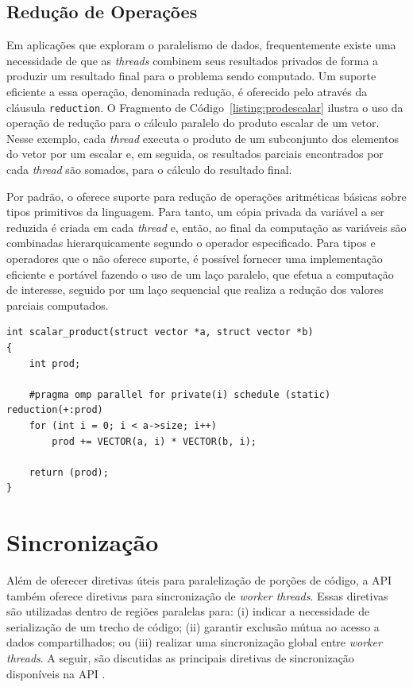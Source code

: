\documentclass{SBCbookchapter}
\begin{document}
	\subsection{Redução de Operações}
	\label{subsection: reducao de operacoes}

		Em aplicações que exploram o paralelismo de dados,
		frequentemente existe uma necessidade de que as \textit{threads}
		combinem seus resultados privados de forma a produzir um
		resultado final para o problema sendo computado. Um suporte
		eficiente a essa operação, denominada redução, é oferecido pelo
		\openmp através da cláusula \texttt{reduction}. O Fragmento de
		Código~\ref{listing:prodescalar} ilustra o uso da operação de
		redução para o cálculo paralelo do produto escalar de um vetor.
		Nesse exemplo, cada \textit{thread} executa o produto de um
		subconjunto dos elementos do vetor por um escalar e, em seguida,
		os resultados parciais encontrados por cada \textit{thread} são
		somados, para o cálculo do resultado final.

		Por padrão, o \openmp oferece suporte  para redução de operações
		aritméticas básicas sobre tipos primitivos da linguagem. Para
		tanto, um cópia privada da variável a ser reduzida é criada em
		cada \textit{thread} e, então, ao final da computação as
		variáveis são combinadas hierarquicamente segundo o operador
		especificado. Para tipos e operadores que o \openmp não oferece
		suporte, é possível fornecer uma implementação eficiente e
		portável fazendo o uso de um laço paralelo, que efetua a
		computação de interesse, seguido por um laço sequencial que
		realiza a redução dos valores parciais computados.

\begin{lstlisting}[float,floatplacement=b,frame=single, caption=Produto escalar.,
label=listing:prodescalar]
int scalar_product(struct vector *a, struct vector *b)
{
	int prod;

	#pragma omp parallel for private(i) schedule (static) reduction(+:prod)
	for (int i = 0; i < a->size; i++)
		prod += VECTOR(a, i) * VECTOR(b, i);
	
	return (prod);
}
\end{lstlisting}


\section{Sincronização}
\label{section: sincronizacao}

	Além de oferecer diretivas úteis para paralelização de porções de
	código, a API \openmp também oferece diretivas para sincronização de
	\textit{worker threads}. Essas diretivas são utilizadas dentro de
	regiões paralelas para: (i) indicar a necessidade de serialização de
	um trecho de código; (ii) garantir exclusão mútua ao acesso a dados
	compartilhados; ou (iii) realizar uma sincronização global entre
	\textit{worker threads}. A seguir, são discutidas as principais
	diretivas de sincronização disponíveis na API \openmp.
\end{document}
